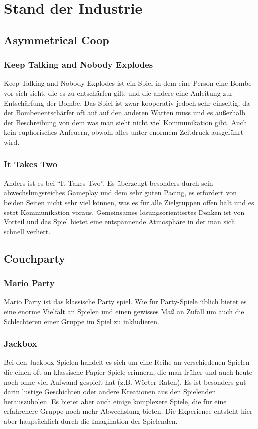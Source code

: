 \chapter{Stand der Industrie\label{_industrie}}

\section{Asymmetrical Coop}

\subsection{Keep Talking and Nobody Explodes}
Keep Talking and Nobody Explodes ist ein Spiel in dem eine Person eine Bombe vor sich sieht, die es zu entschärfen gilt, und die andere eine Anleitung zur Entschärfung der Bombe. Das Spiel ist zwar kooperativ jedoch sehr einseitig, da der Bombenentschärfer oft auf auf den anderen Warten muss und es außerhalb der Beschreibung von dem was man sieht nicht viel Kommunikation gibt. Auch kein euphorisches Anfeuern, obwohl alles unter enormem Zeitdruck ausgeführt wird.

\subsection{It Takes Two}
Anders ist es bei "`It Takes Two"'. Es überzeugt besonders durch sein abwechslungsreiches Gameplay und dem sehr guten Pacing, es erfordert von beiden Seiten nicht sehr viel können, was es für alle Zielgruppen offen hält und es setzt Kommunikation voraus. Gemeinsames lösungsorientiertes Denken ist von Vorteil und das Spiel bietet eine entspannende Atmosphäre in der man sich schnell verliert.

\section{Couchparty}

\subsection{Mario Party}
Mario Party ist das klassische Party spiel. Wie für Party-Spiele üblich bietet es eine enorme Vielfalt an Spielen und einen gewisses Maß an Zufall um auch die Schlechteren einer Gruppe im Spiel zu inkludieren.

\subsection{Jackbox}
Bei den Jackbox-Spielen handelt es sich um eine Reihe an verschiedenen Spielen die einen oft an klassische Papier-Spiele erinnern, die man früher und auch heute noch ohne viel Aufwand gespielt hat (z.B. Wörter Raten). Es ist besonders gut darin lustige Geschichten oder andere Kreationen aus den Spielenden herauszuholen. Es bietet aber auch einige komplexere Spiele, die für eine erfahrenere Gruppe noch mehr Abwechslung bieten. Die Experience entsteht hier aber haupsächlich durch die Imagination der Spielenden.

